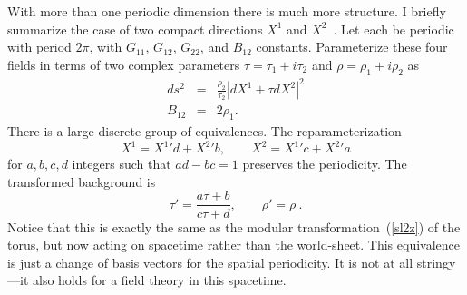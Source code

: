 With more than one periodic dimension there is much more structure.
I briefly summarize the case of two compact directions $X^1$ and
$X^2$~\cite{du2}.  Let each be periodic with period
$2\pi$, with
$G_{11}$,
$G_{12}$, $G_{22}$, and $B_{12}$ constants.  Parameterize these
four fields in terms of two complex parameters $\tau = \tau_1 +
i\tau_2$ and $\rho = \rho_1 + i \rho_2$ as
\begin{eqnarray}
ds^2 &=& \frac{\rho_2}{\tau_2} |dX^1 + \tau dX^2|^2
\nonumber\\
B_{12} &=& 2\rho_1. \label{2dpar}
\end{eqnarray}
There is a large discrete group of equivalences.  The
reparameterization
\begin{equation}
X^1 = {X^1}' d + {X^2}' b, \qquad X^2 = {X^1}' c + {X^2}' a
\end{equation}
for $a,b,c,d$ integers such that $ad-bc = 1$ preserves the
periodicity.  The transformed background is
\begin{equation}
\tau' = \frac{a \tau + b}{c \tau + d},\qquad \rho' =  \rho\ .
\end{equation}
Notice that this is exactly the same as the modular
transformation~(\ref{sl2z}) of the torus, but now acting on
spacetime rather than the world-sheet.  This equivalence is just
a change of basis vectors for the spatial periodicity.  It is
not at all stringy---it also holds for a field theory in this
spacetime.

